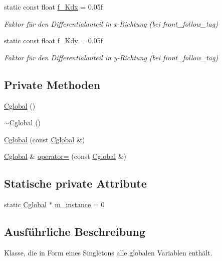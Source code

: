 \begin{DoxyCompactItemize}
static const float \hyperlink{class_cglobal_a898e02a3650a5e6445aca8411ed79194}{f\_\-Kdx} = 0.05f
\begin{DoxyCompactList}\small\item\em Faktor für den Differentialanteil in x-\/Richtung (bei front\_\-follow\_\-tag) \end{DoxyCompactList}\item 
static const float \hyperlink{class_cglobal_a8ff8f3e1711db988e5a936af1d5f2d42}{f\_\-Kdy} = 0.05f
\begin{DoxyCompactList}\small\item\em Faktor für den Differentialanteil in y-\/Richtung (bei front\_\-follow\_\-tag) \end{DoxyCompactList}\end{DoxyCompactItemize}
\subsection*{Private Methoden}
\begin{DoxyCompactItemize}
\item 
\hyperlink{class_cglobal_a9847b00476a6f18dbd936472e1a9efbf}{Cglobal} ()
\item 
\hyperlink{class_cglobal_a16a55c21346fe1cd9b9511ee05fd485e}{$\sim$Cglobal} ()
\item 
\hyperlink{class_cglobal_a5a91823b196c10cba84cc6526308e76f}{Cglobal} (const \hyperlink{class_cglobal}{Cglobal} \&)
\item 
\hyperlink{class_cglobal}{Cglobal} \& \hyperlink{class_cglobal_acc7503a161a449d009877f1d14ba71c4}{operator=} (const \hyperlink{class_cglobal}{Cglobal} \&)
\end{DoxyCompactItemize}
\subsection*{Statische private Attribute}
\begin{DoxyCompactItemize}
\item 
static \hyperlink{class_cglobal}{Cglobal} $\ast$ \hyperlink{class_cglobal_afb7ab45601acda975c029de5db73b3ea}{m\_\-instance} = 0
\end{DoxyCompactItemize}


\subsection{Ausführliche Beschreibung}
Klasse, die in Form eines Singletons alle globalen Variablen enthält. 

